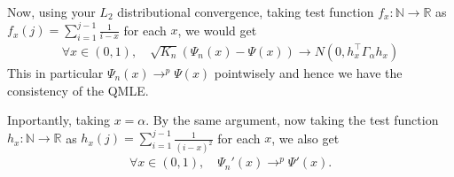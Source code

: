 \documentclass{article}
\begin{document}
Now, using your $L_2$ distributional convergence, taking test function $f_x:\mathbb{N}\to \mathbb{R}$ as $f_x(j) = \sum_{i=1}^{j-1}\frac{1}{i-x}$ for each $x$, we would get 
\begin{align*}
   \forall x\in (0,1), \quad  \sqrt{K_n} (\Psi_n(x) - \Psi(x)) \to N(0, h_x^\top \Gamma_\alpha h_x)
\end{align*}
This in particular $\Psi_n(x)\to^p \Psi(x)$ pointwisely and hence we have the consistency of the QMLE. 

Inportantly, taking $x=\alpha$.  
By the same argument, now taking the test function $h_x:\mathbb{N}\to \mathbb{R}$ as $h_x(j) = \sum_{i=1}^{j-1}\frac{1}{(i-x)^2}$ for each $x$, we also get
\begin{align*}
   \forall x\in (0,1), \quad  \Psi_n'(x) \to^p \Psi'(x). 
\end{align*}
\end{document}
